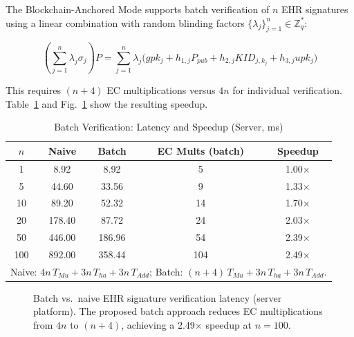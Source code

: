 \documentclass[conference]{IEEEtran}
\begin{document}
The Blockchain-Anchored Mode supports batch verification of $n$
EHR signatures using a linear combination with random blinding
factors $\{\lambda_j\}_{j=1}^n \in \mathbb{Z}_q^*$:

\begin{equation}
\left(\sum_{j=1}^n \lambda_j \sigma_j\right) P =
\sum_{j=1}^n \lambda_j \bigl(
  gpk_j + h_{1,j}P_{pub} + h_{2,j}KID_{j,k_j} + h_{3,j}upk_j
\bigr)
\end{equation}

This requires $(n+4)$ EC multiplications versus $4n$ for individual
verification. Table~\ref{tab:batch} and Fig.~\ref{fig:batch} show
the resulting speedup.

\begin{table}[htbp]
\centering
\caption{Batch Verification: Latency and Speedup (Server, ms)}
\label{tab:batch}
\renewcommand{\arraystretch}{1.2}
\begin{tabular}{ccccc}
\toprule
\textbf{$n$} & \textbf{Naive} & \textbf{Batch} & \textbf{EC Mults (batch)} & \textbf{Speedup} \\
\midrule
  1  &   8.92 &   8.92 &   5 & 1.00$\times$ \\
  5  &  44.60 &  33.56 &   9 & 1.33$\times$ \\
 10  &  89.20 &  52.32 &  14 & 1.70$\times$ \\
 20  & 178.40 &  87.72 &  24 & 2.03$\times$ \\
 50  & 446.00 & 186.96 &  54 & 2.39$\times$ \\
100  & 892.00 & 358.44 & 104 & 2.49$\times$ \\
\bottomrule
\multicolumn{5}{l}{\small Naive: $4n\,T_{Mu}+3n\,T_{ha}+3n\,T_{Add}$;\;
Batch: $(n+4)\,T_{Mu}+3n\,T_{ha}+3n\,T_{Add}$.}
\end{tabular}
\end{table}

\begin{figure}[htbp]
\centering
{}
\caption{Batch vs.\ naive EHR signature verification latency (server platform).
The proposed batch approach reduces EC multiplications from $4n$ to $(n+4)$,
achieving a 2.49$\times$ speedup at $n=100$.}
\label{fig:batch}
\end{figure}
\end{document}
